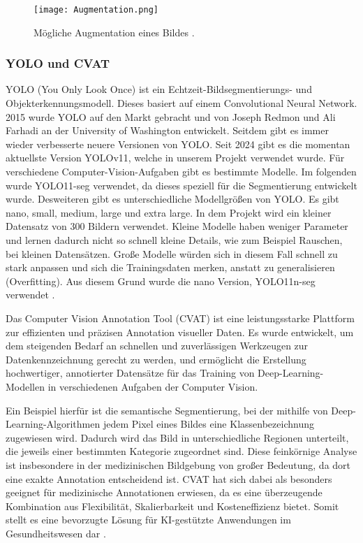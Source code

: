 \documentclass[
	german,
	accentcolor=10c,%
	type=intern,
	marginpar=false
	]{tudapub}
\begin{document}
\begin{figure}[H]
    \centering
    \texttt{[image: Augmentation.png]}
    \caption{Mögliche Augmentation eines Bildes \cite{Augmentation}.}
    \label{fig:Augmentation}
\end{figure}

\subsubsection{YOLO und CVAT}
YOLO (You Only Look Once) ist ein Echtzeit-Bildsegmentierungs- und Objekterkennungsmodell. Dieses basiert auf einem Convolutional Neural Network. 2015 wurde YOLO auf den Markt gebracht und von Joseph Redmon und Ali Farhadi an der University of Washington entwickelt. Seitdem gibt es immer wieder verbesserte neuere Versionen von YOLO. Seit 2024 gibt es die momentan aktuellste Version YOLOv11, welche in unserem Projekt verwendet wurde. Für verschiedene Computer-Vision-Aufgaben gibt es bestimmte Modelle. Im folgenden wurde YOLO11-seg verwendet, da dieses speziell für die Segmentierung entwickelt wurde. Desweiteren gibt es unterschiedliche Modellgrößen von YOLO. Es gibt nano, small, medium, large und extra large. In dem Projekt wird ein kleiner Datensatz von 300 Bildern verwendet. Kleine Modelle haben weniger Parameter und lernen dadurch nicht so schnell kleine Details, wie zum Beispiel Rauschen, bei kleinen Datensätzen. Große Modelle würden sich in diesem Fall schnell zu stark anpassen und sich die Trainingsdaten merken, anstatt zu generalisieren (Overfitting). Aus diesem Grund wurde die nano Version, YOLO11n-seg verwendet \cite{YOLO11}.


Das Computer Vision Annotation Tool (CVAT) ist eine leistungsstarke Plattform zur effizienten und präzisen Annotation visueller Daten. Es wurde entwickelt, um dem steigenden Bedarf an schnellen und zuverlässigen Werkzeugen zur Datenkennzeichnung gerecht zu werden, und ermöglicht die Erstellung hochwertiger, annotierter Datensätze für das Training von Deep-Learning-Modellen in verschiedenen Aufgaben der Computer Vision. 

Ein Beispiel hierfür ist die semantische Segmentierung, bei der mithilfe von Deep-Learning-Algorithmen jedem Pixel eines Bildes eine Klassenbezeichnung zugewiesen wird. Dadurch wird das Bild in unterschiedliche Regionen unterteilt, die jeweils einer bestimmten Kategorie zugeordnet sind. Diese feinkörnige Analyse ist insbesondere in der medizinischen Bildgebung von großer Bedeutung, da dort eine exakte Annotation entscheidend ist. CVAT hat sich dabei als besonders geeignet für medizinische Annotationen erwiesen, da es eine überzeugende Kombination aus Flexibilität, Skalierbarkeit und Kosteneffizienz bietet. Somit stellt es eine bevorzugte Lösung für KI-gestützte Anwendungen im Gesundheitswesen dar \cite{CVAT}.
\end{document}
